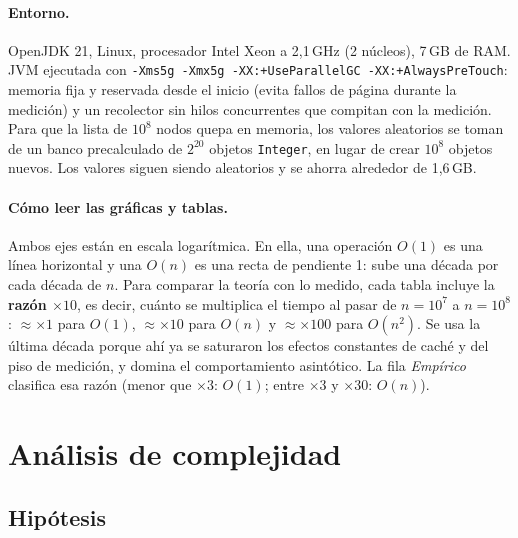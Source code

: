 \documentclass[11pt,a4paper]{article}
\newcommand{\Oone}{$O(1)$}
\newcommand{\On}{$O(n)$}
\begin{document}
\paragraph{Entorno.} OpenJDK 21, Linux, procesador Intel Xeon a 2,1\,GHz (2 núcleos), 7\,GB de RAM.
JVM ejecutada con \texttt{-Xms5g -Xmx5g -XX:+UseParallelGC -XX:+AlwaysPreTouch}: memoria fija y reservada
desde el inicio (evita fallos de página durante la medición) y un recolector sin hilos concurrentes que
compitan con la medición. Para que la lista de $10^8$ nodos quepa en memoria, los valores aleatorios
se toman de un banco precalculado de $2^{20}$ objetos \texttt{Integer}, en lugar de crear $10^8$ objetos
nuevos. Los valores siguen siendo aleatorios y se ahorra alrededor de 1,6\,GB.

\paragraph{Cómo leer las gráficas y tablas.} Ambos ejes están en escala logarítmica. En ella, una
operación \Oone{} es una línea horizontal y una \On{} es una recta de pendiente 1: sube una década por
cada década de $n$. Para comparar la teoría con lo medido, cada tabla incluye la \textbf{razón
$\times10$}, es decir, cuánto se multiplica el tiempo al pasar de $n=10^7$ a $n=10^8$: $\approx\times1$
para \Oone, $\approx\times10$ para \On{} y $\approx\times100$ para $O(n^2)$. Se usa la última década
porque ahí ya se saturaron los efectos constantes de caché y del piso de medición, y domina el
comportamiento asintótico. La fila \emph{Empírico} clasifica esa razón (menor que $\times3$: \Oone;
entre $\times3$ y $\times30$: \On).

\section{Análisis de complejidad}

\subsection{Hipótesis}
\end{document}
